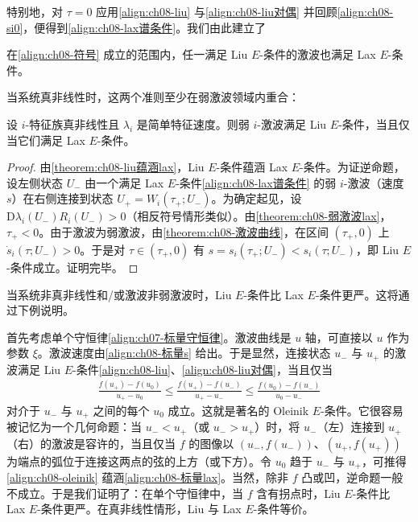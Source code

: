 \documentclass[../../main.tex]{subfiles}
\begin{document}
特别地，对 $\tau=0$ 应用\eqref{align:ch08-liu} 与\eqref{align:ch08-liu对偶} 并回顾\eqref{align:ch08-si0}，便得到\eqref{align:ch08-lax谱条件}。我们由此建立了

\begin{theorem}\label{theorem:ch08-liu蕴涵lax}
在\eqref{align:ch08-符号} 成立的范围内，任一满足 Liu $E$-条件的激波也满足 Lax $E$-条件。
\end{theorem}

当系统真非线性时，这两个准则至少在弱激波领域内重合：

\begin{theorem}\label{theorem:ch08-真非线性等价}
设 $i$-特征族真非线性且 $\lambda_i$ 是简单特征速度。则弱 $i$-激波满足 Liu $E$-条件，当且仅当它们满足 Lax $E$-条件。
\end{theorem}

\begin{proof}
由\cref{theorem:ch08-liu蕴涵lax}，Liu $E$-条件蕴涵 Lax $E$-条件。为证逆命题，设左侧状态 $U_-$ 由一个满足 Lax $E$-条件\eqref{align:ch08-lax谱条件} 的弱 $i$-激波（速度 $s$）在右侧连接到状态 $U_+=W_i(\tau_+;U_-)$。为确定起见，设 $\mathrm{D}\lambda_i(U_-)R_i(U_-)>0$（相反符号情形类似）。由\cref{theorem:ch08-弱激波lax}，$\tau_+<0$。由于激波为弱激波，由\cref{theorem:ch08-激波曲线}，在区间 $(\tau_+,0)$ 上 $\dot s_i(\tau;U_-)>0$。于是对 $\tau\in(\tau_+,0)$ 有 $s=s_i(\tau_+;U_-)<s_i(\tau;U_-)$，即 Liu $E$-条件成立。证明完毕。
\end{proof}

当系统非真非线性和/或激波非弱激波时，Liu $E$-条件比 Lax $E$-条件更严。这将通过下例说明。

首先考虑单个守恒律\eqref{align:ch07-标量守恒律}。激波曲线是 $u$ 轴，可直接以 $u$ 作为参数 $\xi$。激波速度由\eqref{align:ch08-标量s} 给出。于是显然，连接状态 $u_-$ 与 $u_+$ 的激波满足 Liu $E$-条件\eqref{align:ch08-liu}、\eqref{align:ch08-liu对偶}，当且仅当
\begin{align}
\frac{f(u_+)-f(u_0)}{u_+-u_0}\leqslant\frac{f(u_+)-f(u_-)}{u_+-u_-}\leqslant\frac{f(u_0)-f(u_-)}{u_0-u_-}
\label{align:ch08-oleinik}
\end{align}
对介于 $u_-$ 与 $u_+$ 之间的每个 $u_0$ 成立。这就是著名的 Oleinik $E$-条件。它很容易被记忆为一个几何命题：当 $u_-<u_+$（或 $u_->u_+$）时，将 $u_-$（左）连接到 $u_+$（右）的激波是容许的，当且仅当 $f$ 的图像以 $(u_-,f(u_-))$、$(u_+,f(u_+))$ 为端点的弧位于连接这两点的弦的上方（或下方）。令 $u_0$ 趋于 $u_-$ 与 $u_+$，可推得\eqref{align:ch08-oleinik} 蕴涵\eqref{align:ch08-标量lax}。当然，除非 $f$ 凸或凹，逆命题一般不成立。于是我们证明了：在单个守恒律中，当 $f$ 含有拐点时，Liu $E$-条件比 Lax $E$-条件更严。在真非线性情形，Liu 与 Lax $E$-条件等价。
\end{document}
